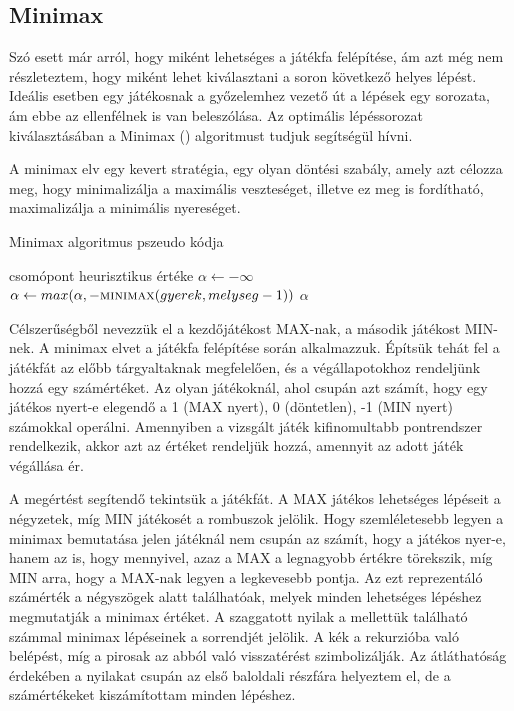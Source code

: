 \subsection{Minimax}
Szó esett már arról, hogy miként lehetséges a játékfa felépítése, ám azt még nem részleteztem, hogy miként lehet kiválasztani a soron következő helyes lépést. Ideális esetben egy játékosnak a győzelemhez vezető út a lépések egy sorozata, ám ebbe az ellenfélnek is van beleszólása. Az optimális lépéssorozat kiválasztásában a Minimax () algoritmust tudjuk segítségül hívni.\ujsor

A minimax elv egy kevert stratégia, egy olyan döntési szabály, amely azt célozza meg, hogy minimalizálja a maximális veszteséget, illetve ez meg is fordítható, maximalizálja a minimális nyereséget. \ujsor

\begin{algorithm}
	\caption{Minimax algoritmus pszeudo kódja}
	\label{alg:minimax}
\begin{algorithmic}[1]
		\State \Return csomópont heurisztikus értéke
	\Else
		\State $\alpha \gets -\infty$
			\State $\alpha \gets max(\alpha, -\Call{minimax}{gyerek, melyseg - 1})$
			\State \Return $\alpha$
		\EndFor
	\EndIf
	\EndFunction
\end{algorithmic}
\end{algorithm}

Célszerűségből nevezzük el a kezdőjátékost MAX-nak, a második játékost MIN-nek. A minimax elvet a játékfa felépítése során alkalmazzuk. Építsük tehát fel a játékfát az előbb tárgyaltaknak megfelelően, és a végállapotokhoz rendeljünk hozzá egy számértéket. Az olyan játékoknál, ahol csupán azt számít, hogy egy játékos nyert-e elegendő a 1 (MAX nyert), 0 (döntetlen), -1 (MIN nyert) számokkal operálni. Amennyiben a vizsgált játék kifinomultabb pontrendszer rendelkezik, akkor azt az értéket rendeljük hozzá, amennyit az adott játék végállása ér.\ujsor


A megértést segítendő tekintsük a  játékfát. A MAX játékos lehetséges lépéseit a négyzetek, míg MIN játékosét a rombuszok jelölik. Hogy szemléletesebb legyen a minimax bemutatása jelen játéknál nem csupán az számít, hogy a játékos nyer-e, hanem az is, hogy mennyivel, azaz a MAX a legnagyobb értékre törekszik, míg MIN arra, hogy a MAX-nak legyen a legkevesebb pontja. Az ezt reprezentáló számérték a négyszögek alatt találhatóak, melyek minden lehetséges lépéshez megmutatják a minimax értéket. A szaggatott nyilak a mellettük található számmal minimax lépéseinek a sorrendjét jelölik. A kék a rekurzióba való belépést, míg a pirosak az abból való visszatérést szimbolizálják. Az átláthatóság érdekében a nyilakat csupán az első baloldali részfára helyeztem el, de a számértékeket kiszámítottam minden lépéshez. \ujsor

